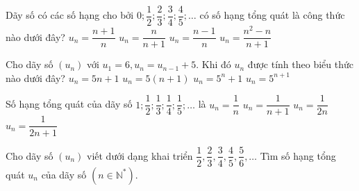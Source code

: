 \begin{ex}%
	Dãy số có các số hạng cho bởi $0;\dfrac{1}{2};\dfrac{2}{3};\dfrac{3}{4};\dfrac{4}{5};\ldots $ có số hạng tổng quát  là công thức nào dưới đây?
	 \choice
		 {$u_n=\dfrac{n+1}{n}$}
		{$u_n=\dfrac{n}{n+1}$} 
		{\True $u_n=\dfrac{n-1}{n}$  }
		 {$u_n=\dfrac{n^2-n}{n+1}$}
\end{ex}

\begin{ex}%
	Cho dãy số $(u_n)$ với $u_1=6,u_n=u_{n-1}+5$. Khi đó $u_n$ được tính  theo biểu thức nào dưới đây?
	 \choice
		{\True  $u_n=5n+1$}
		 {$u_n=5(n+1)$}
		 {$u_n=5^n+1$}
		 {$u_n=5^{n+1}$}
\end{ex}

\begin{ex}%
	Số hạng tổng quát của dãy số $1; \dfrac{1}{2}; \dfrac{1}{3}; \dfrac{1}{4}; \dfrac{1}{5};  \ldots$ là
	\choice 
		 {\True $u_n=\dfrac{1}{n}$}
		 {$u_n=\dfrac{1}{n+1}$}
		 {$u_n=\dfrac{1}{2n}$}
		 {$u_n=\dfrac{1}{2n+1}$}
\end{ex}

\begin{bt}%
	Cho dãy số $\left(u_n\right)$ viết dưới dạng khai triển $\dfrac{1}{2},\dfrac{2}{3},\dfrac{3}{4},\dfrac{4}{5},\dfrac{5}{6},\ldots$ Tìm  số hạng tổng quát $u_n$ của dãy số $\left(n\in \mathbb{N}^{\ast}\right)$.
\end{bt}


